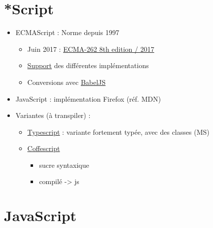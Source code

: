 \hypertarget{script}{%
\section{*Script}\label{script}}

\begin{itemize}
\tightlist
\item
  ECMAScript : Norme depuis 1997

  \begin{itemize}
  \tightlist
  \item
    Juin 2017 :
    \href{https://www.ecma-international.org/publications/standards/Ecma-262.htm}{ECMA-262
    8th edition / 2017}
  \item
    \href{http://kangax.github.io/compat-table/es2016plus/}{Support} des
    différentes implémentations
  \item
    Conversions avec \href{https://babeljs.io/}{BabelJS}
  \end{itemize}
\item
  JavaScript : implémentation Firefox (réf. MDN)
\item
  Variantes (à transpiler) :

  \begin{itemize}
  \tightlist
  \item
    \href{https://www.typescriptlang.org/}{Typescript} : variante
    fortement typée, avec des classes (MS)
  \item
    \href{http://coffeescript.org/}{Coffescript}

    \begin{itemize}
    \tightlist
    \item
      sucre syntaxique
    \item
      compilé -\textgreater{} js
    \end{itemize}
  \end{itemize}
\end{itemize}

\hypertarget{javascript}{%
\section{JavaScript}\label{javascript}}

